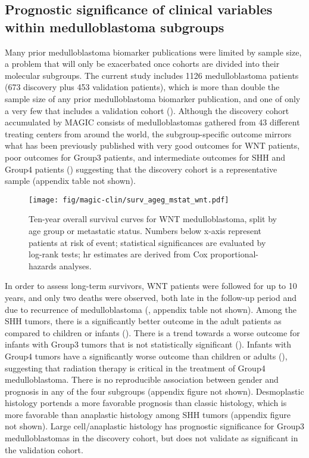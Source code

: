 \subsection{Prognostic significance of clinical variables within medulloblastoma subgroups}

Many prior medulloblastoma biomarker publications were limited by sample size, a problem that will only be exacerbated once cohorts are divided into their molecular subgroups.  The current study includes 1126 medulloblastoma patients (673 discovery plus 453 validation patients), which is more than double the sample size of any prior medulloblastoma biomarker publication, and one of only a very few that includes a validation cohort (). Although the discovery cohort accumulated by MAGIC consists of medulloblastomas gathered from 43 different treating centers from around the world, the subgroup-specific outcome mirrors what has been previously published with very good outcomes for WNT patients, poor outcomes for Group3 patients, and intermediate outcomes for SHH and Group4 patients () suggesting that the discovery cohort is a representative sample (appendix table not shown).

\begin{figure}[h]
	\begin{center}
		\texttt{[image: fig/magic-clin/surv\_ageg\_mstat\_wnt.pdf]}
	\end{center}
	\caption[Ten-year overall survival curves for WNT medulloblastoma]
	{
	Ten-year overall survival curves for WNT medulloblastoma, split by age group or metastatic status.
	Numbers below x-axis represent patients at risk of event; statistical significances are evaluated by log-rank tests; \gls{hr} estimates are derived from Cox proportional-hazards analyses.
	}
	\label{fig:surv_ageg_mstat_wnt}
\end{figure}

In order to assess long-term survivors, WNT patients were followed for up to 10 years, and only two deaths were observed, both late in the follow-up period and due to recurrence of medulloblastoma (, appendix table not shown).  Among the SHH tumors, there is a significantly better outcome in the adult patients as compared to children or infants ().  There is a trend towards a worse outcome for infants with Group3 tumors that is not statistically significant ().  Infants with Group4 tumors have a significantly worse outcome than children or adults (), suggesting that radiation therapy is critical in the treatment of Group4 medulloblastoma. There is no reproducible association between gender and prognosis in any of the four subgroups (appendix figure not shown). Desmoplastic histology portends a more favorable prognosis than classic histology, which is more favorable than anaplastic histology among SHH tumors (appendix figure not shown). Large cell/anaplastic histology has prognostic significance for Group3 medulloblastomas in the discovery cohort, but does not validate as significant in the validation cohort.

